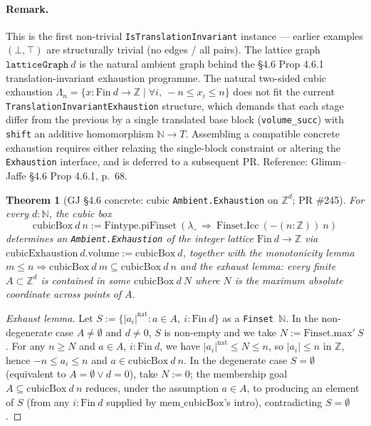 \documentclass[a4paper,11pt]{article}
\newtheorem{theorem}{Theorem}
\begin{document}
\paragraph{Remark.} This is the first non-trivial
\texttt{IsTranslationInvariant} instance — earlier examples
$(\bot, \top)$ are structurally trivial (no edges / all pairs).
The lattice graph $\texttt{latticeGraph}\ d$ is the natural ambient
graph behind the \S 4.6 Prop 4.6.1 translation-invariant exhaustion
programme. The natural two-sided cubic exhaustion
$\Lambda_n = \{x : \mathrm{Fin}\ d \to \mathbb{Z} \mid \forall i,\ -n \le x_i \le n\}$
does not fit the current
\texttt{TranslationInvariantExhaustion} structure, which demands
that each stage differ from the previous by a single translated base
block (\texttt{volume\_succ}) with \texttt{shift} an additive
homomorphism $\mathbb{N} \to T$. Assembling a compatible concrete
exhaustion requires either relaxing the single-block constraint or
altering the \texttt{Exhaustion} interface, and is deferred to a
subsequent PR.
Reference: Glimm--Jaffe \cite{glimm-jaffe} \S 4.6 Prop 4.6.1, p.~68.

\begin{theorem}[GJ \S 4.6 concrete: cubic \texttt{Ambient.Exhaustion} on
$\mathbb{Z}^d$; PR \#245]
For every $d : \mathbb{N}$, the \emph{cubic box}
\[
  \mathrm{cubicBox}\ d\ n
  := \mathrm{Fintype.piFinset}\ (\lambda \_\ \Rightarrow\
    \mathrm{Finset.Icc}\ (-(n:\mathbb{Z}))\ n)
\]
determines an \texttt{Ambient.Exhaustion} of the integer lattice
$\mathrm{Fin}\ d \to \mathbb{Z}$ via
$\mathrm{cubicExhaustion}\ d .\mathrm{volume} := \mathrm{cubicBox}\ d$,
together with the monotonicity lemma $m \le n \Rightarrow
\mathrm{cubicBox}\ d\ m \subseteq \mathrm{cubicBox}\ d\ n$ and the
exhaust lemma: every finite $A \subset \mathbb{Z}^d$ is contained in
some $\mathrm{cubicBox}\ d\ N$ where $N$ is the maximum absolute
coordinate across points of $A$.
\end{theorem}
\begin{proof}[Exhaust lemma]
Let $S := \{|a_i|^{\mathrm{nat}} : a \in A,\ i : \mathrm{Fin}\ d\}$
as a \texttt{Finset $\mathbb{N}$}. In the non-degenerate case
$A \ne \emptyset$ and $d \ne 0$, $S$ is non-empty and we take
$N := \mathrm{Finset.max'}\ S$. For any $n \ge N$ and $a \in A$,
$i : \mathrm{Fin}\ d$, we have $|a_i|^{\mathrm{nat}} \le N \le n$,
so $|a_i| \le n$ in $\mathbb{Z}$, hence $-n \le a_i \le n$ and
$a \in \mathrm{cubicBox}\ d\ n$. In the degenerate case $S = \emptyset$
(equivalent to $A = \emptyset \vee d = 0$), take $N := 0$; the
membership goal $A \subseteq \mathrm{cubicBox}\ d\ n$ reduces,
under the assumption $a \in A$, to producing an element of $S$ (from
any $i : \mathrm{Fin}\ d$ supplied by $\mathrm{mem\_cubicBox}$'s
intro), contradicting $S = \emptyset$.
\end{proof}
\end{document}
